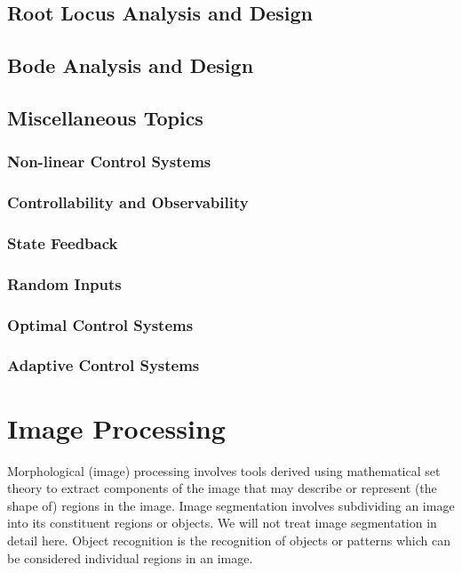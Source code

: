 \documentclass[11pt]{book}
\theoremstyle{example}
\begin{document}
\section{Root Locus Analysis and Design}

\section{Bode Analysis and Design}

\section{Miscellaneous Topics}

\subsection{Non-linear Control Systems}

\subsection{Controllability and Observability}

\subsection{State Feedback}

\subsection{Random Inputs}

\subsection{Optimal Control Systems}

\subsection{Adaptive Control Systems}

\chapter{Image Processing}

Morphological (image) processing involves tools derived using mathematical set theory to extract components of the image that may describe or represent (the shape of) regions in the image. Image segmentation involves subdividing an image into its constituent regions or objects. We will not treat image segmentation in detail here. Object recognition is the recognition of objects or patterns which can be considered individual regions in an image.
\end{document}
